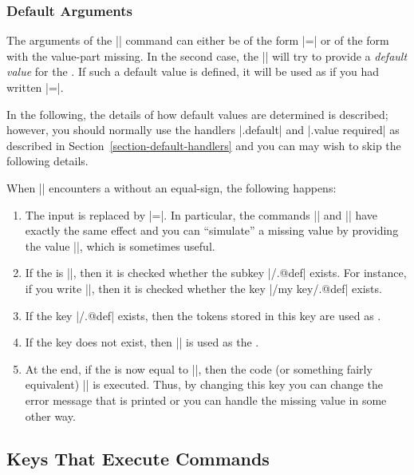\subsubsection{Default Arguments} 

The arguments of the |\pgfkeys| command can either be of the form
|=| or of the form  with the
value-part missing. In the second case, the |\pgfkeys| will try to
provide a \emph{default value} for the . If such a default
value is defined, it will be used as if you had written
|=|.

In the following, the details of how default values are determined is
described; however, you should normally use the handlers |.default|
and |.value required| as described in
Section~\ref{section-default-handlers} and you can may wish to skip
the following details.

When |\pgfkeys| encounters a  without an equal-sign, the
following happens:
\begin{enumerate}
\item The input is replaced by |=\pgfkeysnovalue|. In
  particular, the commands || and
  || have exactly the same effect and
  you can ``simulate'' a missing value by providing the value
  |\pgfkeysnovalue|, which is sometimes useful. 
\item If the  is |\pgfkeysnovalue|, then it is checked
  whether the subkey |/.@def| exists. For instance, if you
  write ||, then it is checked whether the key
  |/my key/.@def| exists.
\item If the key |/.@def| exists, then the tokens stored in
  this key are used as .
\item If the key does not exist, then |\pgfkeysnovalue| is used as the
  .
\item At the end, if the  is now equal to
  |\pgfkeysvaluerequired|, then the code  (or something fairly equivalent)
  ||
  is executed. Thus, by changing this key you can change the error
  message that is printed or you can handle the missing value in some
  other way.
\end{enumerate}



\subsection{Keys That Execute Commands}

